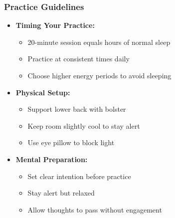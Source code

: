 \begin{frame}[fragile]\frametitle{Practice Guidelines}
    \begin{itemize}
        \item \textbf{Timing Your Practice:}
        \begin{itemize}
            \item 20-minute session equals hours of normal sleep
            \item Practice at consistent times daily
            \item Choose higher energy periods to avoid sleeping
        \end{itemize}
        \item \textbf{Physical Setup:}
        \begin{itemize}
            \item Support lower back with bolster
            \item Keep room slightly cool to stay alert
            \item Use eye pillow to block light
        \end{itemize}
        \item \textbf{Mental Preparation:}
        \begin{itemize}
            \item Set clear intention before practice
            \item Stay alert but relaxed
            \item Allow thoughts to pass without engagement
        \end{itemize}
    \end{itemize}
\end{frame}

